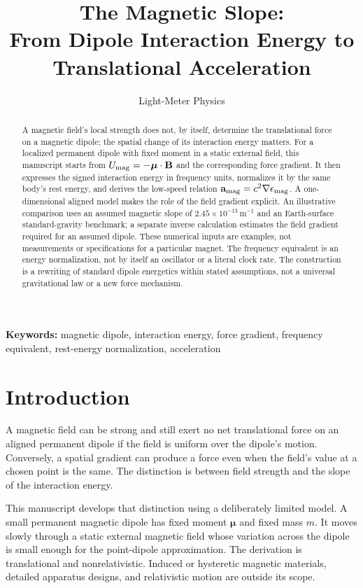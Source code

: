 \documentclass[12pt]{article}
\title{The Magnetic Slope:\\
From Dipole Interaction Energy to Translational Acceleration}
\author{Light-Meter Physics}
\date{}
\begin{document}
\maketitle

\begin{abstract}
A magnetic field's local strength does not, by itself, determine the translational force on a magnetic dipole; the spatial change of its interaction energy matters. For a localized permanent dipole with fixed moment in a static external field, this manuscript starts from $U_{\rm mag}=-\boldsymbol{\mu}\cdot\mathbf B$ and the corresponding force gradient. It then expresses the signed interaction energy in frequency units, normalizes it by the same body's rest energy, and derives the low-speed relation $\mathbf a_{\rm mag}=c^2\nabla\epsilon_{\rm mag}$. A one-dimensional aligned model makes the role of the field gradient explicit. An illustrative comparison uses an assumed magnetic slope of $2.45\times10^{-13}\,\mathrm{m^{-1}}$ and an Earth-surface standard-gravity benchmark; a separate inverse calculation estimates the field gradient required for an assumed dipole. These numerical inputs are examples, not measurements or specifications for a particular magnet. The frequency equivalent is an energy normalization, not by itself an oscillator or a literal clock rate. The construction is a rewriting of standard dipole energetics within stated assumptions, not a universal gravitational law or a new force mechanism.
\end{abstract}

\noindent\textbf{Keywords:} magnetic dipole, interaction energy, force gradient, frequency equivalent, rest-energy normalization, acceleration

\section{Introduction}

A magnetic field can be strong and still exert no net translational force on an aligned permanent dipole if the field is uniform over the dipole's motion. Conversely, a spatial gradient can produce a force even when the field's value at a chosen point is the same. The distinction is between field strength and the slope of the interaction energy.

This manuscript develops that distinction using a deliberately limited model. A small permanent magnetic dipole has fixed moment $\boldsymbol{\mu}$ and fixed mass $m$. It moves slowly through a static external magnetic field whose variation across the dipole is small enough for the point-dipole approximation. The derivation is translational and nonrelativistic. Induced or hysteretic magnetic materials, detailed apparatus designs, and relativistic motion are outside its scope.
\end{document}
